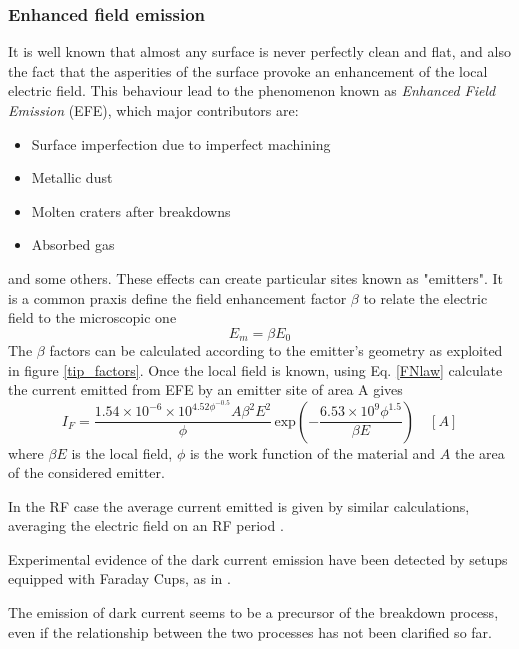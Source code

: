 \subsubsection{Enhanced field emission}

It is well known that almost any surface is never perfectly clean and flat, and also the fact that the asperities of the surface provoke an enhancement of the local electric field. This behaviour lead to the phenomenon known as \textit{Enhanced Field Emission} (EFE), which major contributors are:
\begin{itemize}
\item Surface imperfection due to imperfect machining
\item Metallic dust
\item Molten craters after breakdowns
\item Absorbed gas
\end{itemize} 
and some others. These effects can create particular sites known as "emitters". It is a common praxis define the field enhancement factor $\beta$ to relate the electric field to the microscopic one
\begin{equation}
E_{m} = \beta E_{0}
\end{equation}
The $\beta$ factors can be calculated according to the emitter's geometry \cite{Rohrbach:190223} as exploited in figure \ref{tip_factors}.
Once the local field is known, using Eq. \ref{FNlaw} calculate the current emitted from EFE by an emitter site of area A gives 
\begin{equation}
I_F = \frac{ 1.54\times10^{-6} \times 10^{4.52\phi^{-0.5}} A \beta^2 E^2}{  \phi } \, \text{exp} \left ( -\frac{6.53\times 10^9 \phi^{1.5}}{\beta E} \right ) \quad [A]  \label{If}
\end{equation}
where $\beta E$ is the local field, $\phi$ is the work function of the material and $A$ the area of the considered emitter.

 In the RF case the average current emitted is given by similar calculations, averaging the electric field on an RF period  \cite{Wang:1997ip}. 

Experimental evidence of the dark current emission have been detected by setups equipped with Faraday Cups, as in \cite{Wuensch:advaces}.

The emission of dark current seems to be a precursor of the breakdown  process, even if the relationship between the two processes has not been clarified so far.

